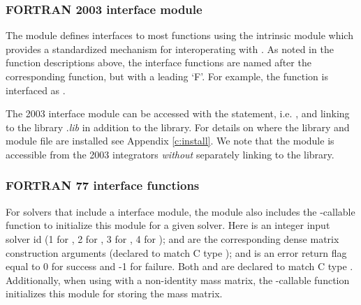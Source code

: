 \subsubsection*{FORTRAN 2003 interface module}
The  {\F} module defines interfaces to most
{\sunmatdense} {\CC} functions using the intrinsic 
module which provides a standardized mechanism for interoperating with {\CC}. As
noted in the {\CC} function descriptions above, the interface functions are
named after the corresponding {\CC} function, but with a leading `F'. For
example, the function  is interfaced as
.

The {\F} 2003 {\sunmatdense} interface module can be accessed with the 
statement, i.e. , and linking to the library
.{\em lib} in addition to the {\CC} library.
For details on where the library and module file
 are installed see Appendix \ref{c:install}.
We note that the module is accessible from the {\F} 2003 {\sundials} integrators
\textit{without} separately linking to the
 library.

\subsubsection*{FORTRAN 77 interface functions}
For solvers that include a {\F} interface module, the {\sunmatdense}
module also includes the {\F}-callable
function  to initialize
this {\sunmatdense} module for a given {\sundials} solver.
Here  is an integer input solver id (1 for {\cvode}, 2 for {\ida}, 3
for {\kinsol}, 4 for {\arkode});  and  are the
corresponding dense matrix construction arguments (declared to
match C type ); and  is an error return flag 
equal to 0 for success and -1 for failure. Both  and 
are declared to match C type . Additionally, when using
{\arkode} with a non-identity mass matrix, the {\F}-callable
function  initializes this
{\sunmatdense} module for storing the mass matrix. 
